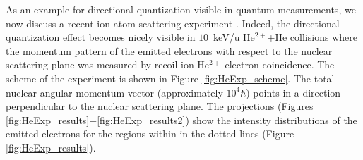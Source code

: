 \documentclass[12pt]{article}
\begin{document}
As an example for directional quantization visible in quantum measurements, we now discuss a recent ion-atom scattering experiment \citep{SchmidtLEtal2014Vortices}. Indeed, the directional quantization effect becomes nicely visible in $10$~keV/u He$^{2+}$+He collisions where the momentum pattern of the emitted electrons with respect to the nuclear scattering plane was measured by recoil-ion He$^{2+}$-electron coincidence. The scheme of the experiment is shown in Figure \ref{fig:HeExp_scheme}. The total nuclear angular momentum vector (approximately $10^{4}\hbar$) points in a direction perpendicular to the nuclear scattering plane. The projections (Figures \ref{fig:HeExp_results}+\ref{fig:HeExp_results2}) show the intensity distributions of the emitted electrons for the regions within in the dotted lines (Figure \ref{fig:HeExp_results}). 
\end{document}
